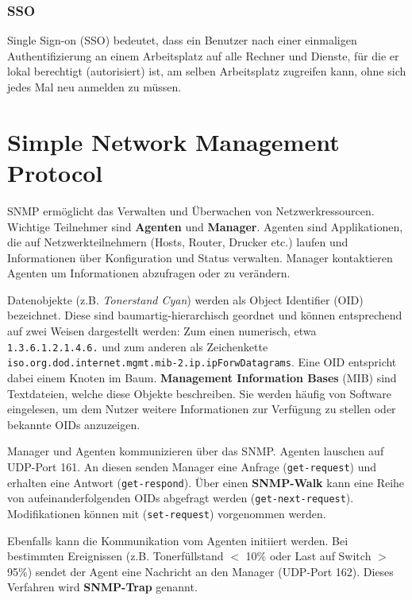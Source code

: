 \documentclass{article} %
\begin{document}
\subsubsection{SSO}
Single Sign-on (SSO) bedeutet, dass ein Benutzer nach einer einmaligen Authentifizierung an einem Arbeitsplatz auf alle Rechner und Dienste, für die er lokal berechtigt (autorisiert) ist, am selben Arbeitsplatz zugreifen kann, ohne sich jedes Mal neu anmelden zu müssen. 

\section{Simple Network Management Protocol}


SNMP ermöglicht das Verwalten und Überwachen von Netzwerkressourcen.
Wichtige Teilnehmer sind \textbf{Agenten} und \textbf{Manager}.
Agenten sind Applikationen, die auf Netzwerkteilnehmern (Hosts, Router, Drucker etc.) laufen und Informationen über Konfiguration und Status verwalten.
Manager kontaktieren Agenten um Informationen abzufragen oder zu verändern.

Datenobjekte (z.B. \emph{Tonerstand Cyan}) werden als Object Identifier (OID) bezeichnet.
Diese sind baumartig-hierarchisch geordnet und können entsprechend auf zwei Weisen dargestellt werden:
Zum einen numerisch, etwa \texttt{1.3.6.1.2.1.4.6.} und zum anderen als Zeichenkette \texttt{iso.org.dod.internet.mgmt.mib-2.ip.ipForwDatagrams}.
Eine OID entspricht dabei einem Knoten im Baum.
\textbf{Management Information Bases} (MIB) sind Textdateien, welche diese Objekte beschreiben.
Sie werden häufig von Software eingelesen, um dem Nutzer weitere Informationen zur Verfügung zu stellen oder bekannte OIDs anzuzeigen.

Manager und Agenten kommunizieren über das SNMP.
Agenten lauschen auf UDP-Port 161.
An diesen senden Manager eine Anfrage (\texttt{get-request}) und erhalten eine Antwort (\texttt{get-respond}).
Über einen \textbf{SNMP-Walk} kann eine Reihe von aufeinanderfolgenden OIDs abgefragt werden (\texttt{get-next-request}).
Modifikationen können mit (\texttt{set-request}) vorgenommen werden.

Ebenfalls kann die Kommunikation vom Agenten initiiert werden.
Bei bestimmten Ereignissen (z.B. Tonerfüllstand $<$ 10\% oder Last auf Switch $>$ 95\%) sendet der Agent eine Nachricht an den Manager (UDP-Port 162).
Dieses Verfahren wird \textbf{SNMP-Trap} genannt.
\end{document}
